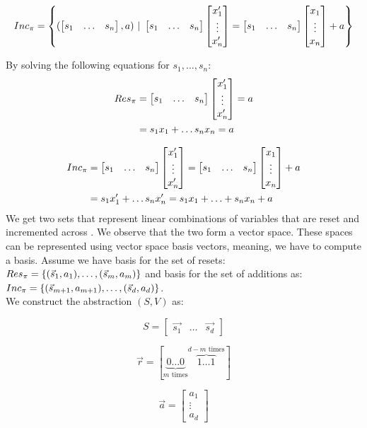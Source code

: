 \begin{equation*}
	Inc_\pi = \left\{(\begin{bmatrix} s_1 & \ldots &s_n \end{bmatrix}, a)\ |\ \begin{bmatrix} s_1 & \ldots &s_n \end{bmatrix} \begin{bmatrix} x_1' \\ \vdots \\ x_n' \end{bmatrix} = \begin{bmatrix} s_1 & \ldots &s_n \end{bmatrix} \begin{bmatrix} x_1 \\ \vdots \\ x_n \end{bmatrix} + a\right\}	
\end{equation*}
\begin{comment}
	\begin{equation*}
	Res_H = \left\{ (\s, a) | H \models \s \cdot \p = a \right\}	
	\end{equation*}
	
	\begin{equation*}
	Inc_H = \left\{(\s, a) | H \models \s \cdot \p = \s \cdot \up + a\right\}	
	\end{equation*}
\end{comment}
By solving the following equations for $s_1, \ldots, s_n$: \\
\begin{align*}
	Res_\pi &= \begin{bmatrix} s_1 & \ldots &s_n \end{bmatrix} \begin{bmatrix} x_1' \\ \vdots \\ x_n' \end{bmatrix} = a \\
 			&= s_1x_1 + \ldots s_nx_n = a
\end{align*}

\begin{align*}
	Inc_\trf &= \sn \pn = \sn \upn + a  \\ \vspace{0.5cm}
			 &= s_1x_1' + \ldots s_nx_n' = s_1x_1 + \ldots + s_nx_n + a
\end{align*}
We get two sets that represent linear combinations of variables that are reset and incremented across \trf. We observe that the two form a vector space. These spaces can be represented using vector space basis vectors, meaning, we have to compute a basis. Assume we have basis for the set of resets:
$Res_\pi = \{(\vec{s}_1, a_1), \ldots, (\vec{s}_m, a_m)\}$ and basis for the set of additions as: $Inc_\pi = \{(\vec{s}_{m+1}, a_{m+1}), \ldots, (\vec{s}_d, a_d)\}$. \\ We construct the \qvasr abstraction $(S, V)$ as:
\begin{center}
\begin{minipage}{0.3\linewidth}
	\begin{equation*}
		S = \begin{bmatrix} \vec{s_1} & \ldots & \vec{s_d} \end{bmatrix}
	\end{equation*}
\end{minipage}
\begin{minipage}{0.3\linewidth}
	\begin{equation*}
		\vec{r} = [ \underbrace{0 \ldots 0}_{m\text{ times}} \overbrace{1 \ldots 1}^{d - m \text{ times}} ]
	\end{equation*}
\end{minipage}
\begin{minipage}{0.3\linewidth}
	\begin{equation*}
		\vec{a} = \begin{bmatrix} a_1 \\ \vdots \\ a_d \end{bmatrix}
	\end{equation*}
\end{minipage}
\end{center}

